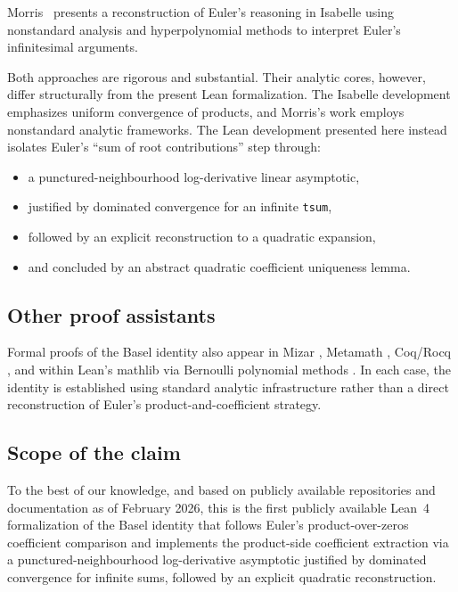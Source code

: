 \documentclass[11pt,a4paper]{article}
\theoremstyle{plain}
\theoremstyle{definition}
\begin{document}
Morris~\cite{Morris2023} presents a reconstruction of Euler’s reasoning in Isabelle using nonstandard analysis and hyperpolynomial methods to interpret Euler’s infinitesimal arguments.

Both approaches are rigorous and substantial. Their analytic cores, however, differ structurally from the present Lean formalization. The Isabelle development emphasizes uniform convergence of products, and Morris’s work employs nonstandard analytic frameworks. The Lean development presented here instead isolates Euler’s “sum of root contributions” step through:

\begin{itemize}[leftmargin=2em]
  \item a punctured-neighbourhood log-derivative linear asymptotic,
  \item justified by dominated convergence for an infinite \texttt{tsum},
  \item followed by an explicit reconstruction to a quadratic expansion,
  \item and concluded by an abstract quadratic coefficient uniqueness lemma.
\end{itemize}

\subsection{Other proof assistants}

Formal proofs of the Basel identity also appear in Mizar \cite{MizarBasel232}, Metamath \cite{MetamathBasel}, Coq/Rocq \cite{CoqtailMathZeta2}, and within Lean’s mathlib via Bernoulli polynomial methods \cite{MathlibZetaValues}. In each case, the identity is established using standard analytic infrastructure rather than a direct reconstruction of Euler’s product-and-coefficient strategy.

\subsection{Scope of the claim}

To the best of our knowledge, and based on publicly available repositories and documentation as of February 2026, this is the first publicly available Lean~4 formalization of the Basel identity that follows Euler’s product-over-zeros coefficient comparison and implements the product-side coefficient extraction via a punctured-neighbourhood log-derivative asymptotic justified by dominated convergence for infinite sums, followed by an explicit quadratic reconstruction.
\end{document}
